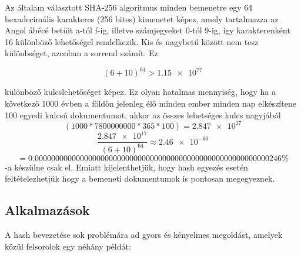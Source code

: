 Az általam választott SHA-256 algoritmus \cite{gueron2011sha} minden bemenetre egy 64 hexadecimális karakteres (256 bites) kimenetet képez, amely tartalmazza az Angol ábécé betűit a-tól f-ig, illetve számjegyeket 0-tól 9-ig, így karakterenként 16 különböző lehetőségel rendelkezik. Kis és nagybetű között nem tesz különbséget, azonban a sorrend számít. Ez
%
{\hfil $$ (6 + 10)^{64} > \num{1.15e77} $$ \par}

különböző kulcslehetőséget képez. Ez olyan hatalmas mennyiség, hogy ha a következő 1000 évben a földön jelenleg élő minden ember minden nap elkészítene 100 egyedi kulcsú dokumentumot, akkor az összes lehetséges kulcs nagyjából 
%
\begin{equation}
    (1000 * \num{7800000000} * 365 * 100) = \num{2.847e17}
\end{equation}
\begin{equation}
    \frac{\num{2.847e17}}{(6 + 10)^{64}} \approx \num{2.46e-60}
\end{equation}
\begin{equation}
     = 0.000000000000000000000000000000000000000000000000000000000246 \%
\end{equation}
%
-a készülne csak el. Emiatt kijelenthetjük, hogy hash egyezés esetén feltételezhetjük hogy a bemeneti dokumentumok is pontosan megegyeznek.


\subsection{Alkalmazások}

A hash bevezetése sok problémára ad gyors és kényelmes megoldást, amelyek közül felsorolok egy néhány példát:


